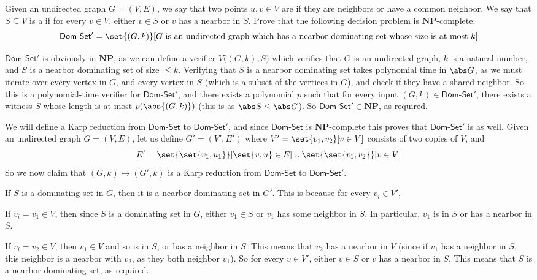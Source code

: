 \documentclass[10pt]{article}
\def\domset{\textsf{Dom-Set}}
\def\NP{\mathbf{NP}}
\begin{document}


\bigskip

\begin{exercise*}

    Given an undirected graph $G=(V,E)$, we say that two points $u,v\in V$ are  if they are neighbors or have a common neighbor.
    We say that $S\subseteq V$ is a  if for every $v\in V$, either $v\in S$ or $v$ has a nearbor in $S$.
    Prove that the following decision problem is $\NP$-complete:
    \[ \domset' = \set{(G,k)}[\text{$G$ is an undirected graph which has a nearbor dominating set whose size is at most $k$}] \]

\end{exercise*}

$\domset'$ is obviously in $\NP$, as we can define a verifier $V\bigl((G,k),S\bigr)$ which verifies that $G$ is an undirected graph, $k$ is a natural number, and $S$ is a nearbor dominating set of size
$\leq k$.
Verifying that $S$ is a nearbor dominating set takes polynomial time in $\abs G$, as we must iterate over every vertex in $G$, and every vertex in $S$ (which is a subset of the vertices in $G$), and check
if they have a shared neighbor.
So this is a polynomial-time verifier for $\domset'$, and there exists a polynomial $p$ such that for every input $(G,k)\in\domset'$, there exists a witness $S$ whose length is at most $p(\abs{(G,k)})$
(this is as $\abs S\leq\abs G$).
So $\domset'\in\NP$, as required.

We will define a Karp reduction from $\domset$ to $\domset'$, and since $\domset$ is $\NP$-complete this proves that $\domset'$ is as well.
Given an undirected graph $G=(V,E)$, let us define $G'=(V',E')$ where $V'=\set{v_1,v_2}[v\in V]$ consists of two copies of $V$, and
\[ E' = \set{\set{v_1,u_1}}[\set{v,u}\in E]\cup\set{\set{v_1,v_2}}[v\in V] \]
So we now claim that $(G,k)\mapsto(G',k)$ is a Karp reduction from $\domset$ to $\domset'$.

If $S$ is a dominating set in $G$, then it is a nearbor dominating set in $G'$.
This is because for every $v_i\in V'$,
\benum
    \item If $v_i=v_1\in V$, then since $S$ is a dominating set in $G$, either $v_1\in S$ or $v_1$ has some neighbor in $S$.
    In particular, $v_1$ is in $S$ or has a nearbor in $S$.
    \item If $v_i=v_2\in V$, then $v_1\in V$ and so is in $S$, or has a neighbor in $S$.
    This means that $v_2$ has a nearbor in $V$ (since if $v_1$ has a neighbor in $S$, this neighbor is a nearbor with $v_2$, as they both neighbor $v_1$).
\eenum
So for every $v\in V'$, either $v\in S$ or $v$ has a nearbor in $S$.
This means that $S$ is a nearbor dominating set, as required.
\end{document}
